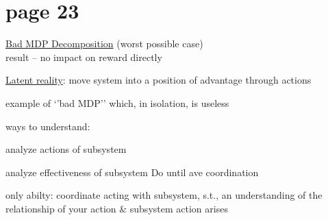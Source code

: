 \section{page 23}

\underline{Bad MDP Decomposition} (worst possible case)\\

result -- no impact on reward directly

\underline{Latent reality}: move system into a position of advantage through actions

example of `'bad MDP'' which, in isolation, is useless


ways to understand:

analyze actions of subsystem

analyze effectiveness of subsystem
Do until ave coordination

only abilty: coordinate acting with subsystem, s.t., an understanding of the relationship of your action \& subsystem action arises 
